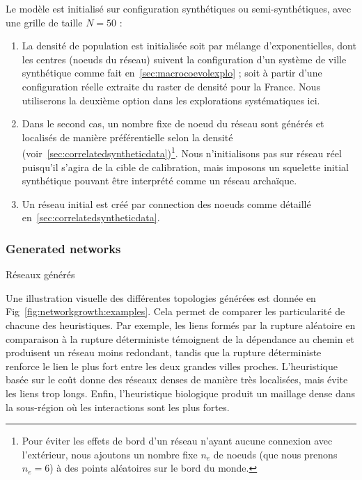 Le modèle est initialisé sur configuration synthétiques ou semi-synthétiques, avec une grille de taille $N=50$ :
\begin{enumerate}
	\item La densité de population est initialisée soit par mélange d'exponentielles, dont les centres (noeuds du réseau) suivent la configuration d'un système de ville synthétique comme fait en~\ref{sec:macrocoevolexplo} ; soit à partir d'une configuration réelle extraite du raster de densité pour la France. Nous utiliserons la deuxième option dans les explorations systématiques ici.
	\item Dans le second cas, un nombre fixe de noeud du réseau sont générés et localisés de manière préférentielle selon la densité (voir~\ref{sec:correlatedsyntheticdata})\footnote{Pour éviter les effets de bord d'un réseau n'ayant aucune connexion avec l'extérieur, nous ajoutons un nombre fixe $n_e$ de noeuds (que nous prenons $n_e = 6$) à des points aléatoires sur le bord du monde.}. Nous n'initialisons pas sur réseau réel puisqu'il s'agira de la cible de calibration, mais imposons un squelette initial synthétique pouvant être interprété comme un réseau archaïque.
	\item Un réseau initial est créé par connection des noeuds comme détaillé en~\ref{sec:correlatedsyntheticdata}.
\end{enumerate}


\subsubsection{Generated networks}{Réseaux générés}

Une illustration visuelle des différentes topologies générées est donnée en Fig~\ref{fig:networkgrowth:examples}. Cela permet de comparer les particularité de chacune des heuristiques. Par exemple, les liens formés par la rupture aléatoire en comparaison à la rupture déterministe témoignent de la dépendance au chemin et produisent un réseau moins redondant, tandis que la rupture déterministe renforce le lien le plus fort entre les deux grandes villes proches. L'heuristique basée sur le coût donne des réseaux denses de manière très localisées, mais évite les liens trop longs. Enfin, l'heuristique biologique produit un maillage dense dans la sous-région où les interactions sont les plus fortes.



